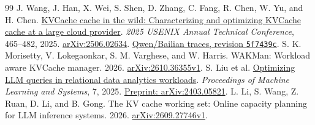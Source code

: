 \documentclass[11pt,letterpaper]{article}
\begin{document}
\begin{thebibliography}{99}
 J. Wang, J. Han, X. Wei, S. Shen, D. Zhang, C. Fang, R. Chen, W. Yu, and H. Chen. \href{https://www.usenix.org/conference/atc25/presentation/wang-jiahao}{KVCache cache in the wild: Characterizing and optimizing KVCache cache at a large cloud provider}. \emph{2025 USENIX Annual Technical Conference}, 465--482, 2025. \href{https://arxiv.org/abs/2506.02634}{arXiv:2506.02634}. \href{https://github.com/alibaba-edu/qwen-bailian-usagetraces-anon/tree/5f7439c51ec248a0c585f7d90a41a6f57773b912}{Qwen/Bailian traces, revision \texttt{5f7439c}}.
 S. K. Morisetty, V. Lokegaonkar, S. M. Varghese, and W. Harris. WAKMan: Workload aware KVCache manager. 2026. \href{https://arxiv.org/abs/2610.36355v1}{arXiv:2610.36355v1}.
 S. Liu et al. \href{https://proceedings.mlsys.org/paper_files/paper/2025/hash/b5dc49f44db2fadc5c4d717c57f4a424-Abstract-Conference.html}{Optimizing LLM queries in relational data analytics workloads}. \emph{Proceedings of Machine Learning and Systems}, 7, 2025. \href{https://arxiv.org/abs/2403.05821}{Preprint: arXiv:2403.05821}.
 L. Li, S. Wang, Z. Ruan, D. Li, and B. Gong. The KV cache working set: Online capacity planning for LLM inference systems. 2026. \href{https://arxiv.org/abs/2609.27746v1}{arXiv:2609.27746v1}.

\end{thebibliography}
\end{document}
